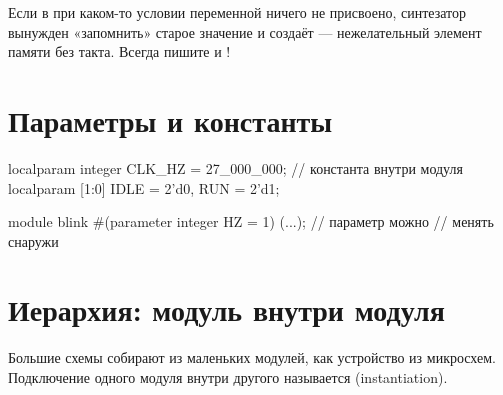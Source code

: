 \begin{warnbox}
Если в  при каком-то условии переменной ничего не присвоено,
синтезатор вынужден «запомнить» старое значение и создаёт  ---
нежелательный элемент памяти без такта. Всегда пишите  и
!
\end{warnbox}

\section{Параметры и константы}

\begin{vcode}
localparam integer CLK_HZ = 27_000_000;  // константа внутри модуля
localparam [1:0]   IDLE = 2'd0, RUN = 2'd1;

module blink #(parameter integer HZ = 1) (...);  // параметр можно
                                                 // менять снаружи
\end{vcode}

\section{Иерархия: модуль внутри модуля}

Большие схемы собирают из маленьких модулей, как устройство из микросхем.
Подключение одного модуля внутри другого называется 
(instantiation).


